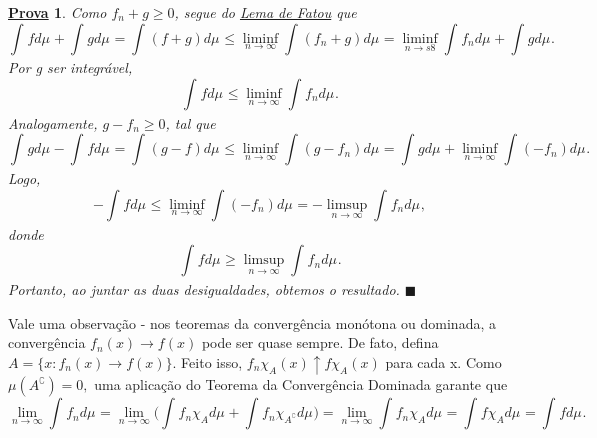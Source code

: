 \documentclass{article}
\newtheorem*{proof*}{\underline{Prova}}
\renewcommand\qedsymbol{$\blacksquare$}
\begin{document}
\begin{proof*}
  Como \(f_{n} +g \geq 0\), segue do \hyperlink{fatou}{\textit{Lema de Fatou}} que 
    \[
      \int_{}f d\mu_{} + \int_{}g d\mu_{} = \int_{}(f+g) d\mu_{} \leq \liminf_{n\to \infty}\int_{}(f_{n}+g) d\mu_{} = \liminf_{n\to s8}\int_{}f_{n} d\mu_{} + \int_{}g d\mu_{}.
    \]
  Por g ser integrável, 
    \[
      \int_{}f d\mu_{} \leq \liminf_{n\to \infty}\int_{}f_{n} d\mu_{}.
    \]
  Analogamente, \(g-f_{n}\geq 0\), tal que 
    \[
      \int_{}g d\mu_{} - \int_{}f d\mu_{} = \int_{}(g-f) d\mu_{} \leq \liminf_{n\to \infty}\int_{}(g-f_{n}) d\mu_{} = \int_{}g d\mu_{} + \liminf_{n\to \infty}\int_{}(-f_{n}) d\mu_{}.
    \]
  Logo, 
    \[
      -\int_{}f d\mu_{} \leq \liminf_{n\to \infty}\int_{}(-f_{n}) d\mu_{} = - \limsup_{n\to \infty}\int_{}f_{n} d\mu_{},
    \]
  donde 
    \[
      \int_{}f d\mu_{} \geq \limsup_{n\to \infty}\int_{}f_{n} d\mu_{}.
    \]
  Portanto, ao juntar as duas desigualdades, obtemos o resultado. \qedsymbol
\end{proof*}
  Vale uma observação - nos teoremas da convergência monótona ou dominada, a convergência \(f_{n}(x)\to f(x)\) pode ser quase sempre. De fato, defina \(A = \{x:f_{n}(x)\to f(x)\}.\) Feito isso, 
  \(f_{n}\chi_{A}(x)\uparrow f \chi_{A}(x)\) para cada x. Como \(\mu (A ^{\complement}) = 0, \) uma aplicação do \hypertarget{dominated_convergence}{Teorema da Convergência Dominada} garante que 
    \[
      \lim_{n\to \infty}\int_{}f_{n} d\mu_{} = \lim_{n\to \infty}\biggl(\int_{}f_{n} \chi_{A} d\mu_{} + \int_{}f_{n}\chi_{A ^{\complement}} d\mu_{}\biggr) = \lim_{n\to \infty}\int_{}f_{n}\chi_{A} d\mu_{} = \int_{}f \chi_{A} d\mu_{} = \int_{}f d\mu_{}.
    \]
\end{document}
